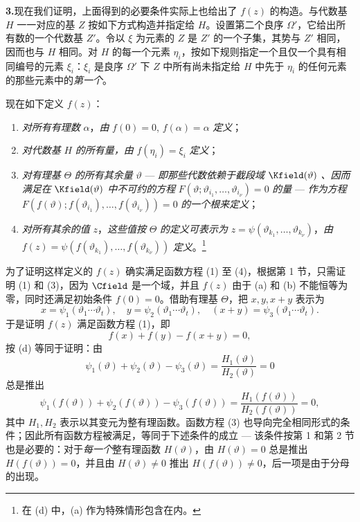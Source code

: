 \noindent\textbf{3.}\quad 现在我们证明，上面得到的必要条件实际上也给出了 $f(z)$ 的构造。与代数基 $H$ 一一对应的基 $Z$ 按如下方式构造并指定给 $H$。设置第二个良序 $\Omega'$，它给出所有数的一个代数基 $Z'$。令以 $\xi$ 为元素的 $Z$ 是 $Z'$ 的一个子集，其势与 $Z'$ 相同，因而也与 $H$ 相同。对 $H$ 的每一个元素 $\eta_i$，按如下规则指定一个且仅一个具有相同编号的元素 $\xi_i$：$\xi_i$ 是良序 $\Omega'$ 下 $Z$ 中所有尚未指定给 $H$ 中先于 $\eta_i$ 的任何元素的那些元素中的\emph{第一个}。

现在如下定义 $f(z)$：
\begin{enumerate}
\item[(a)] \emph{对所有有理数} $\alpha$，\emph{由} $f(0)=0$, $f(\alpha)=\alpha$ \emph{定义}；
\item[(b)] \emph{对代数基} $H$ \emph{的所有量，由} $f(\eta_i)=\xi_i$ \emph{定义}；
\item[(c)] \emph{对有理基} $\Theta$ \emph{的所有其余量} $\vartheta$ --- \emph{即那些代数依赖于截段域} $\Kfield(\vartheta)$ \emph{、因而满足在} $\Kfield(\vartheta)$ \emph{中不可约的方程} $F(\vartheta;\vartheta_{i_1},\ldots,\vartheta_{i_\nu})=0$ \emph{的量} --- \emph{作为方程} $F(f(\vartheta);f(\vartheta_{i_1}),\ldots,f(\vartheta_{i_\nu}))=0$ \emph{的一个根来定义}；
\item[(d)] \emph{对所有其余的值} $z$，\emph{这些值按} $\Theta$ \emph{的定义可表示为} $z=\psi(\vartheta_{k_1},\ldots,\vartheta_{k_\nu})$，\emph{由} $f(z)=\psi(f(\vartheta_{k_1}),\ldots,f(\vartheta_{k_\nu}))$ \emph{定义}。\footnote{在 (d) 中，(a) 作为特殊情形包含在内。}
\end{enumerate}

为了证明这样定义的 $f(z)$ 确实满足函数方程 (1) 至 (4)，根据第 1 节，只需证明 (1) 和 (3)，因为 $\Cfield$ 是一个域，并且 $f(z)$ 由于 (a) 和 (b) 不能恒等为零，同时还满足初始条件 $f(0)=0$。借助有理基 $\Theta$，把 $x,y,x+y$ 表示为
\[
x=\psi_1(\vartheta_1\cdots\vartheta_t),\quad
 y=\psi_2(\vartheta_1\cdots\vartheta_t),\quad
 (x+y)=\psi_3(\vartheta_1\cdots\vartheta_t).
\]
于是证明 $f(z)$ 满足函数方程 (1)，即
\[
f(x)+f(y)-f(x+y)=0,
\]
按 (d) 等同于证明：由
\[
\psi_1(\vartheta)+\psi_2(\vartheta)-\psi_3(\vartheta)
 =\frac{H_1(\vartheta)}{H_2(\vartheta)}=0
\]
总是推出
\[
\psi_1(f(\vartheta))+\psi_2(f(\vartheta))-\psi_3(f(\vartheta))
 =\frac{H_1(f(\vartheta))}{H_2(f(\vartheta))}=0,
\]
其中 $H_1,H_2$ 表示以其变元为整有理函数。函数方程 (3) 也导向完全相同形式的条件；因此所有函数方程被满足，等同于下述条件的成立 --- 该条件按第 1 和第 2 节也是必要的：对于\emph{每一个}整有理函数 $H(\vartheta)$，由 $H(\vartheta)=0$ 总是推出 $H(f(\vartheta))=0$，并且由 $H(\vartheta)\ne0$ 推出 $H(f(\vartheta))\ne0$，后一项是由于分母的出现。


